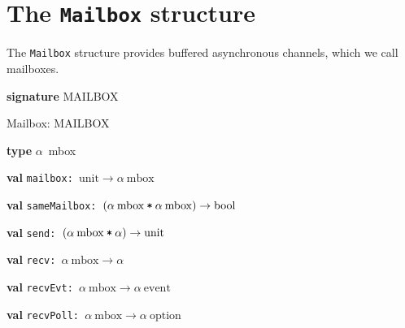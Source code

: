 \section{The \texttt{Mailbox} structure}


The \texttt{Mailbox} structure provides buffered asynchronous channels, which we call mailboxes.\- 
\begin{synopsis}
\item {\textbf{signature}} MAILBOX\label{sig-MAILBOX}
\item {\STRUCTURE} Mailbox: MAILBOX\label{str-Mailbox}
\end{synopsis}

\begin{interface}
\item {}{\textbf{type}} \(\alpha\)~mbox
\item {}{\textbf{val}} {\tt mailbox: \(\mathrm{unit}\rightarrow \alpha\:\mathrm{mbox}\)}

\item {}{\textbf{val}} {\tt sameMailbox: \((\alpha\:\mathrm{mbox}\:\verb,*,\:\alpha\:\mathrm{mbox})\rightarrow \mathrm{bool}\)}

\item {}{\textbf{val}} {\tt send: \((\alpha\:\mathrm{mbox}\:\verb,*,\:\alpha)\rightarrow \mathrm{unit}\)}

\item {}{\textbf{val}} {\tt recv: \(\alpha\:\mathrm{mbox}\rightarrow \alpha\)}

\item {}{\textbf{val}} {\tt recvEvt: \(\alpha\:\mathrm{mbox}\rightarrow \alpha\:\mathrm{event}\)}

\item {}{\textbf{val}} {\tt recvPoll: \(\alpha\:\mathrm{mbox}\rightarrow \alpha\:\mathrm{option}\)}

\end{interface}

